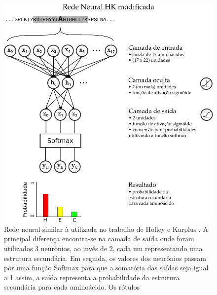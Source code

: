 \begin{figure}
    \includegraphics[width=\linewidth]{../figures/neural_network_HK_similar.pdf}
    \caption{Rede neural similar à utilizada no trabalho de Holley e Karplus \citeyear{key}. A principal diferença encontra-se na camada de saída onde foram utilizados 3 neurônios, ao invés de 2, cada um representando uma estrutura secundária. Em seguida, os valores dos neurônios passam por uma função Softmax para que a somatória das saídas seja igual a 1 assim, a saída representa a probabilidade da estrutura secundária para cada aminoácido. Os rótulos }
    \label{fig:neural_network_HK_similar}
\end{figure}